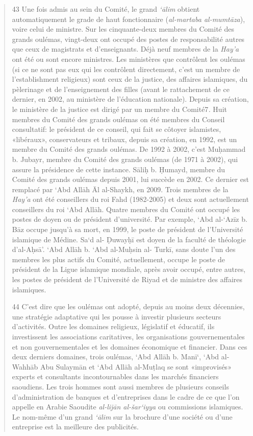 \begin{quote}
43 Une fois admis au sein du Comité, le grand \emph{`ālim} obtient
automatiquement le grade de haut fonctionnaire (\emph{al-martaba
al-mumtāza}), voire celui de ministre. Sur les cinquante-deux membres du
Comité des grands oulémas, vingt-deux ont occupé des postes de
responsabilité autres que ceux de magistrats et d'enseignants. Déjà neuf
membres de la \emph{Hay'a} ont été ou sont encore ministres. Les
ministères que contrôlent les oulémas (si ce ne sont pas eux qui les
contrôlent directement, c'est un membre de l'establishment religieux)
sont ceux de la justice, des affaires islamiques, du pèlerinage et de
l'enseignement des filles (avant le rattachement de ce dernier, en 2002,
au ministère de l'éducation nationale). Depuis sa création, le ministère
de la justice est dirigé par un membre du Comité7\emph{.} Huit membres
du Comité des grands oulémas on été membres du Conseil consultatif: le
président de ce conseil, qui fait se côtoyer islamistes,
«libéraux», conservateurs et tribaux, depuis sa création, en 1992, est
un membre du Comité des grands oulémas. De 1992 à 2002, c'est Muḥammad
b. Jubayr, membre du Comité des grands oulémas (de 1971 à 2002), qui
assure la présidence de cette instance. Sāliḥ b. Ḥumayd, membre du
Comité des grands oulémas depuis 2001, lui succède en 2002. Ce dernier
est remplacé par `Abd Allāh Āl al-Shaykh, en 2009. Trois membres de la
\emph{Hay'a} ont été conseillers du roi Fahd (1982-2005) et deux sont
actuellement conseillers du roi `Abd Allāh. Quatre membres du Comité ont
occupé les postes de doyen ou de président d'université. Par exemple,
`Abd al-`Azīz b. Bāz occupe jusqu'à sa mort, en 1999, le poste de
président de l'Université islamique de Médine. Sa`d al- Ḍuwayḥī est
doyen de la faculté de théologie d'al-Aḥsā'. `Abd Allāh b. `Abd
al-Muḥsin al- Turkī, sans doute l'un des membres les plus actifs du
Comité, actuellement, occupe le poste de président de la Ligue islamique
mondiale, après avoir occupé, entre autres, les postes de président de
l'Université de Riyad et de ministre des affaires islamiques.

44 C'est dire que les oulémas ont adopté, depuis au moins deux
décennies, une stratégie adaptative qui les pousse à investir plusieurs
secteurs d'activités. Outre les domaines religieux, législatif et
éducatif, ils investissent les associations caritatives, les
organisations gouvernementales et non gouvernementales et les domaines
économique et financier. Dans ces deux derniers domaines, trois oulémas,
`Abd Allāh b. Manī`, `Abd
al-Wahhāb Abu Sulaymān et `Abd Allāh al-Muṭlaq se sont «improvisés»
experts et consultants incontournables dans les marchés financiers
saoudiens. Les trois hommes sont aussi membres de plusieurs conseils
d'administration de banques et d'entreprises dans le cadre de ce que
l'on appelle en Arabie Saoudite \emph{al-lijān al-šar`iyya} ou
commissions islamiques. Le nom-même d'un grand \emph{`ālim} sur la
brochure d'une société ou d'une entreprise est la meilleure des
publicités.
\end{quote}


